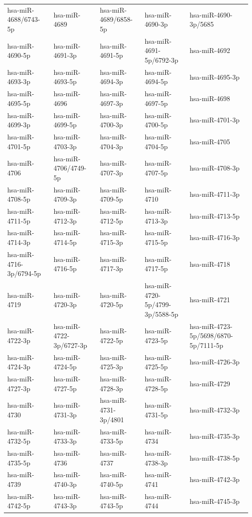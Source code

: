 \begin{longtable}{lllll}
hsa-miR-4688/6743-5p & hsa-miR-4689 & hsa-miR-4689/6858-5p & hsa-miR-4690-3p & hsa-miR-4690-3p/5685 \\
hsa-miR-4690-5p & hsa-miR-4691-3p & hsa-miR-4691-5p & hsa-miR-4691-5p/6792-3p & hsa-miR-4692 \\
hsa-miR-4693-3p & hsa-miR-4693-5p & hsa-miR-4694-3p & hsa-miR-4694-5p & hsa-miR-4695-3p \\
hsa-miR-4695-5p & hsa-miR-4696 & hsa-miR-4697-3p & hsa-miR-4697-5p & hsa-miR-4698 \\
hsa-miR-4699-3p & hsa-miR-4699-5p & hsa-miR-4700-3p & hsa-miR-4700-5p & hsa-miR-4701-3p \\
hsa-miR-4701-5p & hsa-miR-4703-3p & hsa-miR-4704-3p & hsa-miR-4704-5p & hsa-miR-4705 \\
hsa-miR-4706 & hsa-miR-4706/4749-5p & hsa-miR-4707-3p & hsa-miR-4707-5p & hsa-miR-4708-3p \\
hsa-miR-4708-5p & hsa-miR-4709-3p & hsa-miR-4709-5p & hsa-miR-4710 & hsa-miR-4711-3p \\
hsa-miR-4711-5p & hsa-miR-4712-3p & hsa-miR-4712-5p & hsa-miR-4713-3p & hsa-miR-4713-5p \\
hsa-miR-4714-3p & hsa-miR-4714-5p & hsa-miR-4715-3p & hsa-miR-4715-5p & hsa-miR-4716-3p \\
hsa-miR-4716-3p/6794-5p & hsa-miR-4716-5p & hsa-miR-4717-3p & hsa-miR-4717-5p & hsa-miR-4718 \\
hsa-miR-4719 & hsa-miR-4720-3p & hsa-miR-4720-5p & hsa-miR-4720-5p/4799-3p/5588-5p & hsa-miR-4721 \\
hsa-miR-4722-3p & hsa-miR-4722-3p/6727-3p & hsa-miR-4722-5p & hsa-miR-4723-5p & hsa-miR-4723-5p/5698/6870-5p/7111-5p \\
hsa-miR-4724-3p & hsa-miR-4724-5p & hsa-miR-4725-3p & hsa-miR-4725-5p & hsa-miR-4726-3p \\
hsa-miR-4727-3p & hsa-miR-4727-5p & hsa-miR-4728-3p & hsa-miR-4728-5p & hsa-miR-4729 \\
hsa-miR-4730 & hsa-miR-4731-3p & hsa-miR-4731-3p/4801 & hsa-miR-4731-5p & hsa-miR-4732-3p \\
hsa-miR-4732-5p & hsa-miR-4733-3p & hsa-miR-4733-5p & hsa-miR-4734 & hsa-miR-4735-3p \\
hsa-miR-4735-5p & hsa-miR-4736 & hsa-miR-4737 & hsa-miR-4738-3p & hsa-miR-4738-5p \\
hsa-miR-4739 & hsa-miR-4740-3p & hsa-miR-4740-5p & hsa-miR-4741 & hsa-miR-4742-3p \\
hsa-miR-4742-5p & hsa-miR-4743-3p & hsa-miR-4743-5p & hsa-miR-4744 & hsa-miR-4745-3p \\

\end{longtable}
